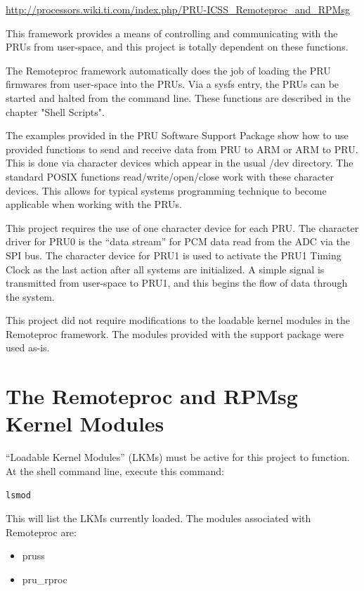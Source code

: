 \url{http://processors.wiki.ti.com/index.php/PRU-ICSS_Remoteproc_and_RPMsg}

This framework provides a means of controlling and communicating with the PRUs from user-space, and this project is totally dependent on these functions.

The Remoteproc framework automatically does the job of loading the PRU firmwares from user-space into the PRUs.  Via a sysfs entry, the PRUs can be started and halted from the command line.  These functions are described in the chapter "Shell Scripts".

The examples provided in the PRU Software Support Package show how to use provided functions to send and receive data from PRU to ARM or ARM to PRU.  This is done via character devices which appear in the usual /dev directory.  The standard POSIX functions read/write/open/close work with these character devices.  This allows for typical systems programming technique to become applicable when working with the PRUs.

This project requires the use of one character device for each PRU.  The character driver for PRU0 is the ``data stream'' for PCM data read from the ADC via the SPI bus.  The character device for PRU1 is used to activate the PRU1 Timing Clock as the last action after all systems are initialized.  A simple signal is transmitted from user-space to PRU1, and this begins the flow of data through the system.

This project did not require modifications to the loadable kernel modules in the Remoteproc framework.  The modules provided with the support package were used as-is.

\section{The Remoteproc and RPMsg Kernel Modules}

``Loadable Kernel Modules'' (LKMs) must be active for this project to function.
At the shell command line, execute this command:

\begin{verbatim}
lsmod
\end{verbatim}

This will list the LKMs currently loaded.  The modules associated with Remoteproc are:

\begin{itemize}
\item pruss
\item pru\_rproc
\end{itemize}

